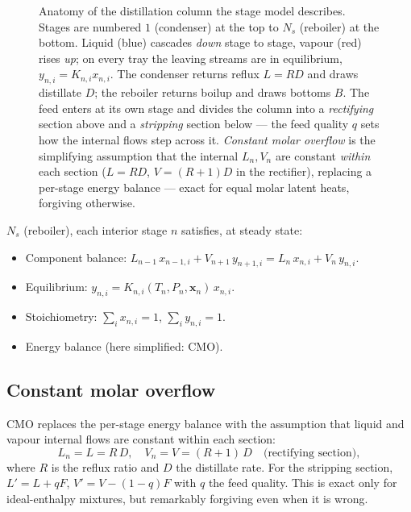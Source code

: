 \documentclass[11pt,a4paper]{article}
\newcommand{\xv}{\mathbf{x}}
\begin{document}
\begin{figure}[ht]
\caption{Anatomy of the distillation column the stage model describes.
Stages are numbered $1$ (condenser) at the top to $N_s$ (reboiler) at the
bottom.  Liquid (blue) cascades \emph{down} stage to stage, vapour (red)
rises \emph{up}; on every tray the leaving streams are in equilibrium,
$y_{n,i}=K_{n,i}x_{n,i}$.  The condenser returns reflux $L=RD$ and draws
distillate $D$; the reboiler returns boilup and draws bottoms $B$.  The
feed enters at its own stage and divides the column into a
\emph{rectifying} section above and a \emph{stripping} section below ---
the feed quality $q$ sets how the internal flows step across it.
\emph{Constant molar overflow} is the simplifying assumption that the
internal $L_n,V_n$ are constant \emph{within} each section
($L=RD$, $V=(R{+}1)D$ in the rectifier), replacing a per-stage energy
balance --- exact for equal molar latent heats, forgiving otherwise.}
\label{fig:distillation-column}
\end{figure}

$N_s$ (reboiler), each interior stage $n$ satisfies, at steady state:

\begin{itemize}[leftmargin=*,nosep,topsep=2pt]
  \item Component balance: $L_{n-1}\,x_{n-1,i} + V_{n+1}\,y_{n+1,i} = L_n\,x_{n,i} + V_n\,y_{n,i}$.
  \item Equilibrium: $y_{n,i} = K_{n,i}(T_n, P_n, \xv_n)\,x_{n,i}$.
  \item Stoichiometry: $\sum_i x_{n,i} = 1$, $\sum_i y_{n,i} = 1$.
  \item Energy balance (here simplified: CMO).
\end{itemize}

\subsection{Constant molar overflow}

CMO replaces the per-stage energy balance with the assumption that
liquid and vapour internal flows are constant within each section:
\begin{equation}
   L_n = L = R\, D, \quad V_n = V = (R+1)\, D
   \quad \text{(rectifying section)},
\end{equation}
where $R$ is the reflux ratio and $D$ the distillate rate.
For the stripping section, $L' = L + qF$, $V' = V - (1-q) F$ with $q$
the feed quality. This is exact only for ideal-enthalpy mixtures, but
remarkably forgiving even when it is wrong.
\end{document}
